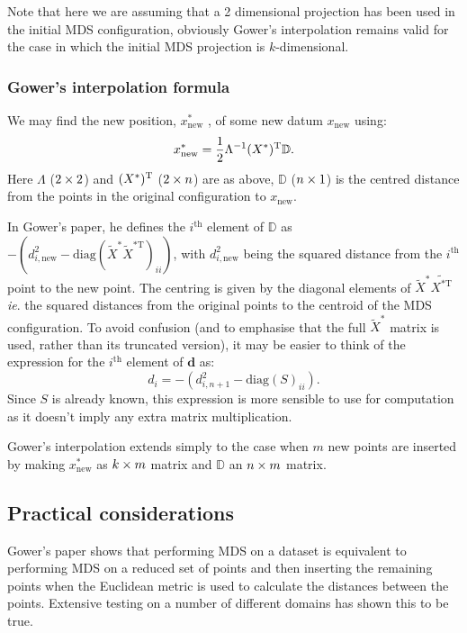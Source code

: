 Note that here we are assuming that a 2 dimensional projection has been used in the initial MDS configuration, obviously Gower's interpolation remains valid for the case in which the initial MDS projection is $k$-dimensional.

\subsubsection{Gower's interpolation formula}

We may find the new position, $x^*_{\text{new}}$ , of some new datum $x_{\text{new}}$ using:
\begin{equation}
x^*_{\text{new}} = \frac{1}{2} \Lambda^{-1} (X^*)^{\text{T}} \mathbb{D}.
\label{gower}
\end{equation}
Here $\Lambda$ ($2 \times 2$) and $(X^*)^{\text{T}}$ ($2 \times n$) are as above, $\mathbb{D}$ ($n \times 1$) is the centred distance from the points in the original configuration to $x_{\text{new}}$.

In Gower's paper, he defines the $i^\text{th}$ element of $\mathbb{D}$ as $-(d^2_{i,\text{new}}-\text{diag}(\tilde{X}^* \tilde{X}^{*\text{T}})_{ii})$, with $d^2_{i,\text{new}}$ being the squared distance from the $i^\text{th}$ point to the new point. The centring is given by the diagonal elements of $\tilde{X}^*\tilde{X^{* \text{T}}}$ \emph{ie}. the squared distances from the original points to the centroid of the MDS configuration. To avoid confusion (and to emphasise that the full $\tilde{X}^*$ matrix is used, rather than its truncated version), it may be easier to think of the expression for the $i^\text{th}$ element of $\mathbf{d}$ as:
\begin{equation}
d_{i} = -(d^2_{i,n+1}-\text{diag}(S)_{ii}).
\end{equation}
Since $S$ is already known, this expression is more sensible to use for computation as it doesn't imply any extra matrix multiplication.

Gower's interpolation extends simply to the case when $m$ new points are inserted by making $x^*_{\text{new}}$ as $k \times m$ matrix and $\mathbb{D}$ an $n \times m$ matrix.


\subsection{Practical considerations}

Gower's paper shows that performing MDS on a dataset is equivalent to performing MDS on a reduced set of points and then inserting the remaining points when the Euclidean metric is used to calculate the distances between the points. Extensive testing on a number of different domains has shown this to be true.

